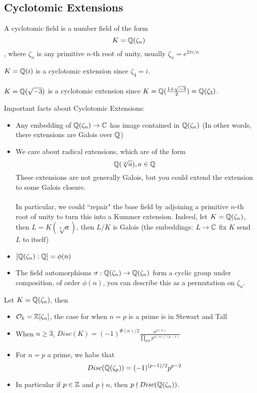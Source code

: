 \subsection{Cyclotomic Extensions}

\begin{definition}
A cyclotomic field is a number field of the form
\[K = \mathbb{Q}(\zeta_n)\]
, where $\zeta_n$ is any primitive $n$-th root of unity, usually $\zeta_n = e^{2\pi i / n}$
\end{definition}

\begin{example}
$K = \mathbb{Q}(i)$ is a cyclotomic extension since $\zeta_4 = i$.\\\\
$K = \mathbb{Q}(\sqrt{-3})$ is a cyclotomic extension since $K = \mathbb{Q}(\frac{1 + \sqrt{-3}}{2}) = \mathbb{Q}(\zeta_3)$.
\end{example}

\begin{proposition}
Important facts about Cyclotomic Extensions:
\begin{itemize}
    \item Any embedding of $\mathbb{Q}(\zeta_n) \to \mathbb{C}$ has image contained in $\mathbb{Q}(\zeta_n)$ (In other words, there extensions are Galois over $\mathbb{Q}$)
    \item We care about radical extensions, which are of the form
    \[\mathbb{Q}(\sqrt[n]{a}), a \in \mathbb{Q}\]
    These extensions are not generally Galois, but you could extend the extension to some Galois closure.\\\\
    In particular, we could ``repair" the base field by adjoining a primitive $n$-th root of unity to turn this into a Kummer extension. Indeed, let $K = \mathbb{Q}(\zeta_n)$, then $L = K(\sqrt[n]{a})$, then $L/K$ is Galois (the embeddings: $L \to \mathbb{C}$ fix $K$ send $L$ to itself)
    \item $[\mathbb{Q}(\zeta_n): \mathbb{Q}] = \phi(n)$
    \item The field automorphisms $\sigma: \mathbb{Q}(\zeta_n) \to \mathbb{Q}(\zeta_n)$ form a cyclic group under composition, of order $\phi(n)$, you can describe this as a permutation on $\zeta_n$.
\end{itemize}
    Let $K = \mathbb{Q}(\zeta_n)$, then
\begin{itemize}
    \item $\mathcal{O}_k = \mathbb{Z}[\zeta_n]$, the case for when $n = p$ is a prime is in Stewart and Tall
    \item When $n \geq 3$, $Disc(K) = (-1)^{\Phi(n)/2} \frac{n^{\phi(n)}}{\prod_{p | n} p^{\phi(n)/(p-1)}}$
    \item For $n = p$ a prime, we habe that
    \[Disc(\mathbb{Q}(\zeta_p)) = (-1)^{(p-1)/2} p^{p-2}\]
    \item In particular if $p \in \mathbb{Z}$ and $p \nmid n$, then $p \nmid Disc(\mathbb{Q}(\zeta_n))$.
\end{itemize}
\end{proposition}

